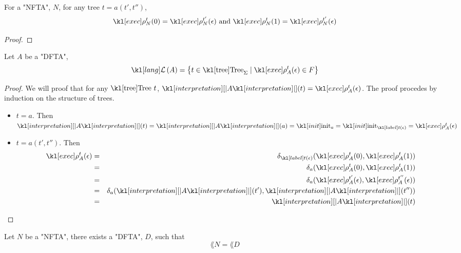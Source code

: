\documentclass{article}
\begin{document}
\begin{lemma}
	For a "NFTA", $N$, for any tree $t = a(t',t'')$,
	\[ \exec N t (0) = \exec N {t'} (\epsilon) \text{ and } \exec N t (1) = \exec N {t'} (\epsilon) \]
\end{lemma}

\begin{proof}
	\todo{}
\end{proof}


\begin{lemma}
	Let $A$ be a "DFTA",
	\[ \lang A = \setdef {t \in \tree_{\Sigma}} {\exec A t (\epsilon) \in F} \]
\end{lemma}

\begin{proof}
	We will proof that for any $\tree \ t$, $\interpret A (t) = \exec A t (\epsilon)$.
	The proof procedes by induction on the structure of trees.
	\begin{itemize}
		\item $t = a$. Then
		      $\interpret A (t) = \interpret A (a)=  \init_a = \init_{\tlabel t {\epsilon}} = \exec A t (\epsilon)$
		\item $t = a(t',t'')$. Then
		      \begin{eqnarray*}
			      \exec A t (\epsilon)  &=& \delta_{\tlabel t {\epsilon}}(\exec A t (0), \exec A t (1)) \\
			      &=& \delta_a (\exec A t (0), \exec A t (1)) \\
			      &=& \delta_a (\exec A {t'}(\epsilon), \exec A {t''} (\epsilon)) \\
			      &=& \delta_a (\interpret A (t'), \interpret A (t'')) \\
			      &=& \interpret A (t)
		      \end{eqnarray*}
	\end{itemize}
\end{proof}

\begin{theorem}
	Let $N$ be a "NFTA", there exists a "DFTA", $D$, such that
	\[ \lang N = \lang D \]
\end{theorem}
\end{document}
